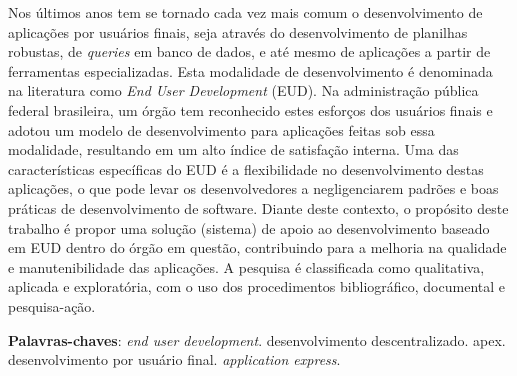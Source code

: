 \begin{resumo}

Nos últimos anos tem se tornado cada vez mais comum o desenvolvimento de aplicações por usuários finais, seja através do desenvolvimento de planilhas robustas, de \textit{queries} em banco de dados, e até mesmo de aplicações a partir de ferramentas especializadas. Esta modalidade de desenvolvimento é denominada na literatura como \textit{End User Development} (EUD). Na administração pública federal brasileira, um órgão tem reconhecido estes esforços dos usuários finais e adotou um modelo de desenvolvimento para aplicações feitas sob essa modalidade, resultando em um alto índice de satisfação interna. Uma das características específicas do EUD é a flexibilidade no desenvolvimento destas aplicações, o que pode levar os desenvolvedores a negligenciarem padrões e boas práticas de desenvolvimento de software. Diante deste contexto, o propósito deste trabalho é propor uma solução (sistema) de apoio ao desenvolvimento baseado em EUD dentro do órgão em questão, contribuindo para a melhoria na qualidade e manutenibilidade das aplicações. A pesquisa é classificada como qualitativa, aplicada e exploratória, com o uso dos procedimentos bibliográfico, documental e pesquisa-ação.



 \vspace{\onelineskip}
    
 \noindent
 \textbf{Palavras-chaves}: \textit{end user development}. desenvolvimento descentralizado. apex. desenvolvimento por usuário final. \textit{application express}.
\end{resumo}

